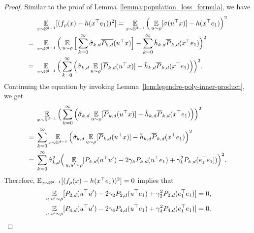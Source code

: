 \begin{proof}
    Similar to the proof of Lemma~\ref{lemma:population_loss_formula}, we have
    \begin{align}
    &\operatorname*{\mathbb{E}}_{x \sim \mathbb{S}^{d - 1}} [(f_\rho(x) - h(x^\top e_1))^2] 
     = \operatorname*{\mathbb{E}}_{x \sim \mathbb{S}^{d - 1}} \Big( \operatorname*{\mathbb{E}}_{u \sim \rho}[\sigma(u^\top x)] - h(x^\top e_1) \Big)^2 \\
     = \;&\operatorname*{\mathbb{E}}_{x \sim \mathbb{S}^{d - 1}} \Big(\operatorname*{\mathbb{E}}_{u \sim \rho}\Big[ \sum_{k = 0}^\infty \hat{\sigma}_{k, d} \overline{P_{k, d}} (u^\top x) \Big] - \sum_{k = 0}^\infty \hat{h}_{k, d} \overline{P}_{k, d}(x^\top e_1) \Big)^2 \\
     = \;&\operatorname*{\mathbb{E}}_{x \sim \mathbb{S}^{d - 1}} \Big(\sum_{k=0}^\infty \Big(\hat{\sigma}_{k, d} \operatorname*{\mathbb{E}}_{u \sim \rho} [\overline{P}_{k,d}(u^\top x)] - \hat{h}_{k, d} \overline{P}_{k,d}(x^\top e_1) \Big) \Big)^2.\label{equ:pf-nc-0}
    \end{align}
    Continuing the equation by invoking Lemma~\ref{lem:legendre-poly-inner-product}, we get
    \begin{align}
        &\operatorname*{\mathbb{E}}_{x \sim \mathbb{S}^{d - 1}} \Big(\sum_{k=0}^\infty \Big(\hat{\sigma}_{k, d} \operatorname*{\mathbb{E}}_{u \sim \rho} [\overline{P}_{k,d}(u^\top x)] - \hat{h}_{k, d} \overline{P}_{k,d}(x^\top e_1) \Big) \Big)^2\\
        =\;&\sum_{k=0}^\infty \operatorname*{\mathbb{E}}_{x \sim \mathbb{S}^{d - 1}} \Big(\hat{\sigma}_{k, d} \operatorname*{\mathbb{E}}_{u \sim \rho} [\overline{P}_{k,d}(u^\top x)] - \hat{h}_{k, d} \overline{P}_{k,d}(x^\top e_1) \Big)^2\\
        =\;&\sum_{k=0}^\infty \hat{\sigma}_{k, d}^2\Big( \operatorname*{\mathbb{E}}_{u,u' \sim \rho} [P_{k,d}(u^\top u') - 2\gamma_k P_{k,d}(u^\top e_1)+ \gamma_k^2 P_{k,d}(e_1^\top e_1])\Big)^2.
    \end{align}
Therefore, $\operatorname*{\mathbb{E}}_{x \sim \mathbb{S}^{d - 1}} [(f_\rho(x) - h(x^\top e_1))^2]=0$ implies that
\begin{align}
    &\operatorname*{\mathbb{E}}_{u,u' \sim \rho} [P_{2,d}(u^\top u') - 2\gamma_2 P_{2,d}(u^\top e_1)+ \gamma_2^2 P_{2,d}(e_1^\top e_1)]=0,\label{equ:pf-nc-1} \\
    &\operatorname*{\mathbb{E}}_{u,u' \sim \rho} [P_{4,d}(u^\top u') - 2\gamma_4 P_{4,d}(u^\top e_1)+ \gamma_4^2 P_{4,d}(e_1^\top e_1)]=0.\label{equ:pf-nc-2} 
\end{align}


\end{proof}
